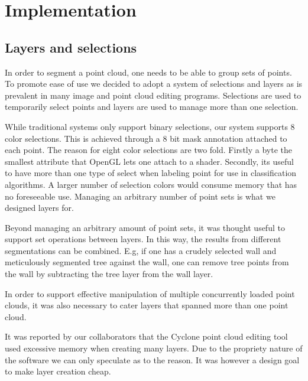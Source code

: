 \chapter{Implementation} \label{ch4}



\section{Layers and selections}
In order to segment a point cloud, one needs to be able to group sets of points. To promote ease of use we decided to adopt a system of selections and layers as is prevalent in many image and point cloud editing programs. Selections are used to temporarily select points and layers are used to manage more than one selection.

While traditional systems only support binary selections, our system supports 8 color selections. This is achieved through a 8 bit mask annotation attached to each point. The reason for eight color selections are two fold. Firstly a byte the smallest attribute that OpenGL lets one attach to a shader. Secondly, its useful to have more than one type of select when labeling point for use in classification algorithms. A larger number of selection colors would consume memory that has no foreseeable use. Managing an arbitrary number of point sets is what we designed layers for.

Beyond managing an arbitrary amount of point sets, it was thought useful  to support set operations between layers. In this way, the results from different segmentations can be combined. E.g, if one has a crudely selected wall and meticulously segmented tree against the wall, one can remove tree points from the wall by subtracting the tree layer from the wall layer.

In order to support effective manipulation of multiple concurrently loaded point clouds, it was also necessary to cater layers that spanned more than one point cloud.

It was reported by our collaborators that the Cyclone  point cloud editing tool used excessive memory when creating many layers. Due to the propriety nature of the software we can only speculate as to the reason. It was however a design goal to make layer creation cheap. 

